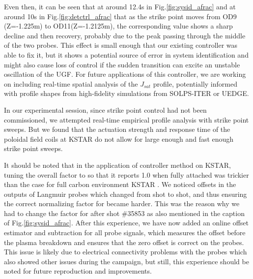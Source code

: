 Even then, it can be seen that at around 12.4s in Fig.\ref{fig:sysid_afrac} and at around 10s in Fig.\ref{fig:detctrl_afrac} that as the strike point moves from OD9 (Z=-1.225m) to OD11(Z=-1.2125m), the corresponding \Afrac value shows a sharp decline and then recovery, probably due to the peak passing through the middle of the two probes.
This effect is small enough that our existing controller was able to fix it, but it shows a potential source of error in system identification and might also cause loss of control if the sudden transition can excite an unstable oscillation of the \ac{UGF}.
For future applications of this controller, we are working on including real-time spatial analysis of the $J_{sat}$ profile, potentially informed with profile shapes from high-fidelity simulations from SOLPS-ITER or UEDGE.

In our experimental session, since strike point control had not been commissioned, we attempted real-time empirical profile analysis with strike point sweeps.
But we found that the actuation strength and response time of the poloidal field coils at KSTAR do not allow for large enough and fast enough strike point sweeps.

It should be noted that in the application of \Afrac controller method on KSTAR, tuning the overall factor to \Afrac so that it reports 1.0 when fully attached was trickier than the case for full carbon environment KSTAR \cite{Eldon_2022_PPCF}.
We noticed offsets in the outputs of Langmuir probes which changed from shot to shot, and thus ensuring the correct normalizing factor for \Afrac became harder.
This was the reason why we had to change the factor for \Afrac after shot \#35853 as also mentioned in the caption of Fig.\ref{fig:sysid_afrac}.
After this experience, we have now added an online offset estimator and subtraction for all probe signals, which measures the offset before the plasma breakdown and ensures that the zero offset is correct on the probes.
This issue is likely due to electrical connectivity problems with the probes which also showed other issues during the campaign, but still, this experience should be noted for future reproduction and improvements.

